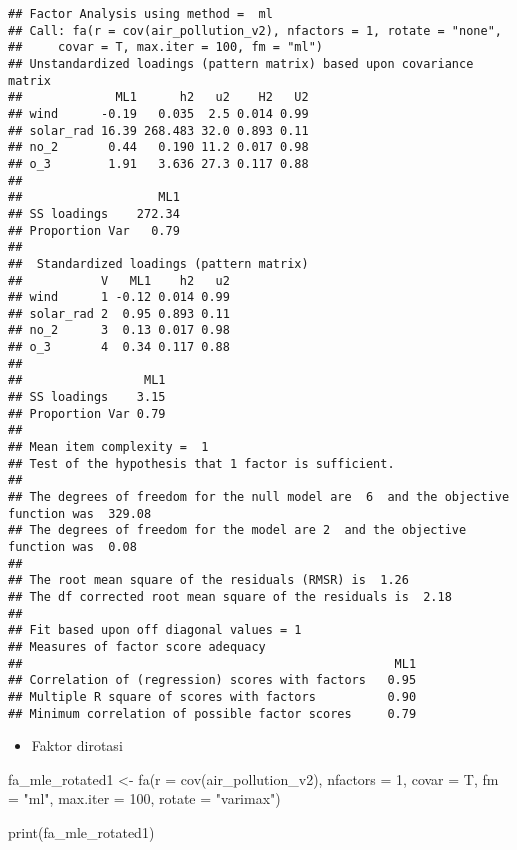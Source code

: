 \documentclass[
]{article}
\newenvironment{Shaded}{\begin{snugshade}}{\end{snugshade}}
\newcommand{\AttributeTok}[1]{\textcolor[rgb]{0.77,0.63,0.00}{#1}}
\newcommand{\DecValTok}[1]{\textcolor[rgb]{0.00,0.00,0.81}{#1}}
\newcommand{\FunctionTok}[1]{\textcolor[rgb]{0.00,0.00,0.00}{#1}}
\newcommand{\NormalTok}[1]{#1}
\newcommand{\OtherTok}[1]{\textcolor[rgb]{0.56,0.35,0.01}{#1}}
\newcommand{\StringTok}[1]{\textcolor[rgb]{0.31,0.60,0.02}{#1}}
\providecommand{\tightlist}{%
  \setlength{\itemsep}{0pt}\setlength{\parskip}{0pt}}
\begin{document}
\begin{verbatim}
## Factor Analysis using method =  ml
## Call: fa(r = cov(air_pollution_v2), nfactors = 1, rotate = "none", 
##     covar = T, max.iter = 100, fm = "ml")
## Unstandardized loadings (pattern matrix) based upon covariance matrix
##             ML1      h2   u2    H2   U2
## wind      -0.19   0.035  2.5 0.014 0.99
## solar_rad 16.39 268.483 32.0 0.893 0.11
## no_2       0.44   0.190 11.2 0.017 0.98
## o_3        1.91   3.636 27.3 0.117 0.88
## 
##                   ML1
## SS loadings    272.34
## Proportion Var   0.79
## 
##  Standardized loadings (pattern matrix)
##           V   ML1    h2   u2
## wind      1 -0.12 0.014 0.99
## solar_rad 2  0.95 0.893 0.11
## no_2      3  0.13 0.017 0.98
## o_3       4  0.34 0.117 0.88
## 
##                 ML1
## SS loadings    3.15
## Proportion Var 0.79
## 
## Mean item complexity =  1
## Test of the hypothesis that 1 factor is sufficient.
## 
## The degrees of freedom for the null model are  6  and the objective function was  329.08
## The degrees of freedom for the model are 2  and the objective function was  0.08 
## 
## The root mean square of the residuals (RMSR) is  1.26 
## The df corrected root mean square of the residuals is  2.18 
## 
## Fit based upon off diagonal values = 1
## Measures of factor score adequacy             
##                                                    ML1
## Correlation of (regression) scores with factors   0.95
## Multiple R square of scores with factors          0.90
## Minimum correlation of possible factor scores     0.79
\end{verbatim}

\begin{itemize}
\tightlist
\item
  Faktor dirotasi
\end{itemize}

\begin{Shaded}
\begin{Highlighting}[]
\NormalTok{fa\_mle\_rotated1 }\OtherTok{\textless{}{-}} \FunctionTok{fa}\NormalTok{(}\AttributeTok{r =} \FunctionTok{cov}\NormalTok{(air\_pollution\_v2), }\AttributeTok{nfactors =} \DecValTok{1}\NormalTok{, }\AttributeTok{covar =}\NormalTok{ T, }\AttributeTok{fm =} \StringTok{"ml"}\NormalTok{, }\AttributeTok{max.iter =} \DecValTok{100}\NormalTok{, }\AttributeTok{rotate =} \StringTok{"varimax"}\NormalTok{)}

\FunctionTok{print}\NormalTok{(fa\_mle\_rotated1)}
\end{Highlighting}
\end{Shaded}
\end{document}
